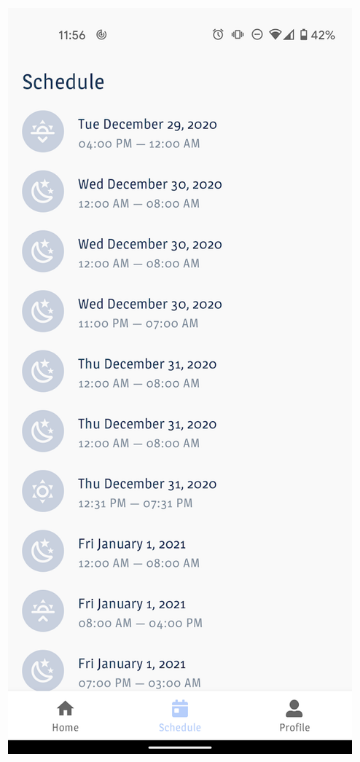 \documentclass[twoside]{ctuthesis}
\begin{document}
\begin{figure}[ht]
	\centering
	\begin{subfigure}{.5\textwidth}
		\centering
		\includegraphics[width=.9\linewidth]{img/uc3-schedule.png}
		\label{fig:uc2-schedule-app}
	\end{subfigure}%

\end{figure}
\end{document}
